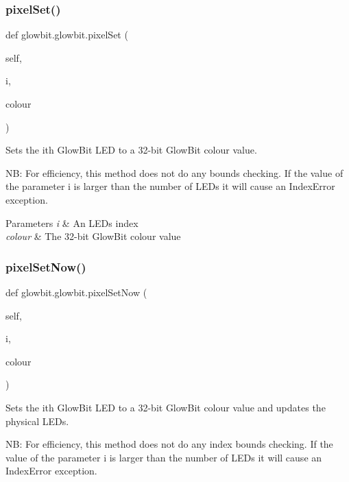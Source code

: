 \subsubsection{\texorpdfstring{pixel\+Set()}{pixelSet()}}
{\footnotesize\ttfamily def glowbit.\+glowbit.\+pixel\+Set (\begin{DoxyParamCaption}\item[{}]{self,  }\item[{}]{i,  }\item[{}]{colour }\end{DoxyParamCaption})}



Sets the i\textquotesingle{}th Glow\+Bit L\+ED to a 32-\/bit Glow\+Bit colour value. 

NB\+: For efficiency, this method does not do any bounds checking. If the value of the parameter i is larger than the number of L\+E\+Ds it will cause an Index\+Error exception.


\begin{DoxyParams}{Parameters}
{\em i} & An L\+ED\textquotesingle{}s index \\
\hline
{\em colour} & The 32-\/bit Glow\+Bit colour value \\
\hline
\end{DoxyParams}
\mbox{\label{classglowbit_1_1glowbit_a6f4167e566106d5eb104933b256f2e14}} 
\subsubsection{\texorpdfstring{pixel\+Set\+Now()}{pixelSetNow()}}
{\footnotesize\ttfamily def glowbit.\+glowbit.\+pixel\+Set\+Now (\begin{DoxyParamCaption}\item[{}]{self,  }\item[{}]{i,  }\item[{}]{colour }\end{DoxyParamCaption})}



Sets the i\textquotesingle{}th Glow\+Bit L\+ED to a 32-\/bit Glow\+Bit colour value and updates the physical L\+E\+Ds. 

NB\+: For efficiency, this method does not do any index bounds checking. If the value of the parameter i is larger than the number of L\+E\+Ds it will cause an Index\+Error exception.


